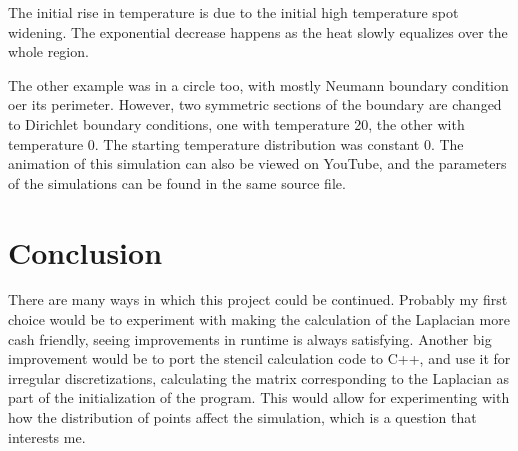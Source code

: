 \documentclass[pdftex,12pt,a4paper]{article}
\begin{document}
		The initial rise in temperature is due to the initial high temperature spot widening. The exponential decrease happens as the heat slowly equalizes over the whole region.
		
		The other example was in a circle too, with mostly Neumann boundary condition oer its perimeter. However, two symmetric sections of the boundary are changed to Dirichlet boundary conditions, one with temperature 20, the other with temperature 0. The starting temperature distribution was constant 0. The animation of this simulation can also be viewed on YouTube, and the parameters of the simulations can be found in the same source file. \cite{conduction}
	\section{Conclusion}
		There are many ways in which this project could be continued. Probably my first choice would be to experiment with making the calculation of the Laplacian more cash friendly, seeing improvements in runtime is always satisfying. Another big improvement would be to port the stencil calculation code to C++, and use it for irregular discretizations, calculating the matrix corresponding to the Laplacian as part of the initialization of the program. This would allow for experimenting with how the distribution of points affect the simulation, which is a question that interests me.
	
    
\end{document}
